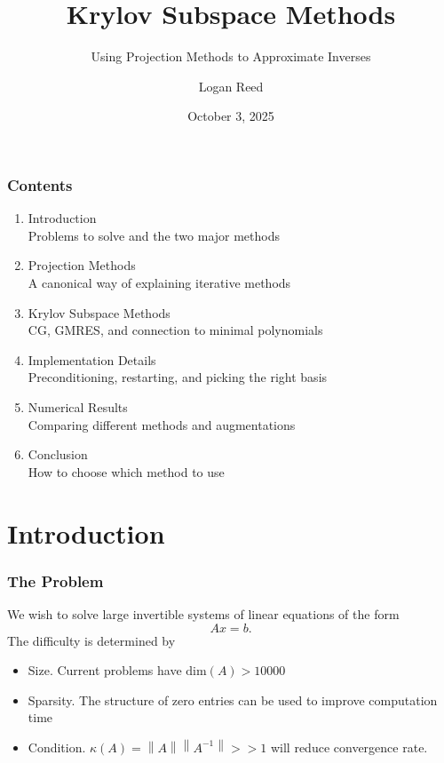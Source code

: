 \documentclass{beamer}
\title{Krylov Subspace Methods}
\subtitle{Using Projection Methods to Approximate Inverses}
\author{Logan Reed}
\date{October 3, 2025}
\begin{document}
	\setcounter{showProgressBar}{0}
	\setcounter{showSlideNumbers}{0}

	\frame{\titlepage}

	\begin{frame}
		\frametitle{Contents} \begin{enumerate}
			\item Introduction \\ \textcolor{ExecusharesGrey}{\footnotesize\hspace{1em} Problems to solve and the two major methods}
			\item Projection Methods  \\ \textcolor{ExecusharesGrey}{\footnotesize\hspace{1em} A canonical way of explaining iterative methods}
			\item Krylov Subspace Methods \\ \textcolor{ExecusharesGrey}{\footnotesize\hspace{1em} CG, GMRES, and connection to minimal polynomials}
			\item Implementation Details \\ \textcolor{ExecusharesGrey}{\footnotesize\hspace{1em} Preconditioning, restarting, and picking the right basis}
			\item Numerical Results \\ \textcolor{ExecusharesGrey}{\footnotesize\hspace{1em} Comparing different methods and augmentations}
			\item Conclusion \\ \textcolor{ExecusharesGrey}{\footnotesize\hspace{1em} How to choose which method to use}
		\end{enumerate}
	\end{frame}

	\setcounter{framenumber}{0}
	\setcounter{showProgressBar}{1}
	\setcounter{showSlideNumbers}{1}
	\section{Introduction}
    \begin{frame}
			\frametitle{The Problem}
      We wish to solve large invertible systems of linear equations of the form
      \[
      Ax = b
      .\] 
      The difficulty is determined by
      \begin{itemize}
        \item Size. Current problems have $\text{dim}\left( A \right) > 10000$
        \item Sparsity. The structure of zero entries can be used to improve computation time
        \item Condition. $\kappa \left( A \right) = \left\| A \right\| \left\| A^{-1} \right\| > > 1$ will reduce convergence rate.
      \end{itemize}
    \end{frame}
\end{document}
